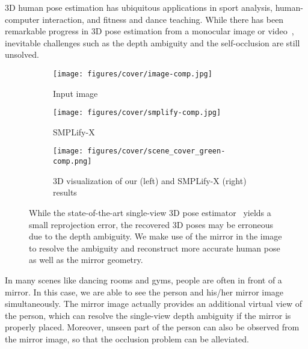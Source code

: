 3D human pose estimation has ubiquitous applications in sport analysis, human-computer interaction, and fitness and dance teaching. While there has been remarkable progress in 3D pose estimation from a monocular image or video~\cite{hmrKanazawa17, Moon_2020_ECCV_I2L-MeshNet, kolotouros2019spin, kocabas2019vibe, xiang2019monocular}, inevitable challenges such as the depth ambiguity and the self-occlusion are still unsolved. 



\begin{figure}
     \centering
     \begin{subfigure}[h]{0.23\textwidth}
         \centering
         \texttt{[image: figures/cover/image-comp.jpg]}
         \caption*{Input image}
     \end{subfigure}
     \begin{subfigure}[h]{0.23\textwidth}
         \centering
         \texttt{[image: figures/cover/smplify-comp.jpg]}
         \caption*{SMPLify-X~\cite{SMPL-X:2019}}
     \end{subfigure}
     \vspace*{0.2cm}
     \begin{subfigure}[h]{0.45\textwidth}
         \centering
         \texttt{[image: figures/cover/scene\_cover\_green-comp.png]}
         \caption*{3D visualization of our (left) and SMPLify-X (right) results}
     \end{subfigure}
     \vspace*{-0.2cm}
     \caption{While the state-of-the-art single-view 3D pose estimator~\cite{SMPL-X:2019} yields a small reprojection error, the recovered 3D poses may be erroneous due to the depth ambiguity. We make use of the mirror in the image to resolve the ambiguity and reconstruct more accurate human pose as well as the mirror geometry.}
     \vspace*{-0.5cm}
    \label{fig:demo1}
\end{figure}



In many scenes like dancing rooms and gyms, people are often in front of a mirror. In this case, we are able to see the person and his/her mirror image simultaneously. The mirror image actually provides an additional virtual view of the person, which can resolve the single-view depth ambiguity if the mirror is properly placed. Moreover, unseen part of the person can also be observed from the mirror image, so that the occlusion problem can be alleviated. 


